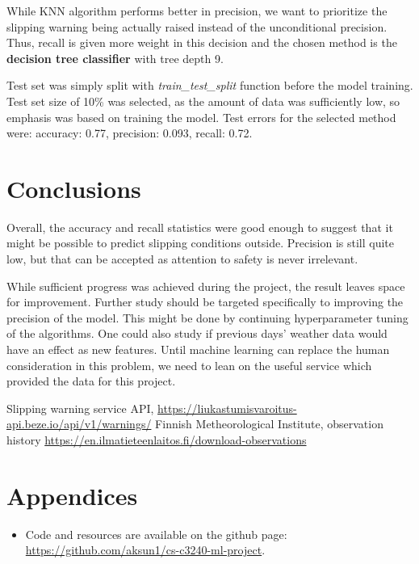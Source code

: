 \documentclass[12pt, a4paper]{article}
\begin{document}
    While KNN algorithm performs better in precision, we want to prioritize the slipping warning being 
    actually raised instead of the unconditional precision. Thus, recall is given more weight in this decision and
    the chosen method is the \textbf{decision tree classifier} with tree depth 9.

    Test set was simply split with \textit{train\_test\_split} function before the model training. 
    Test set size of 10\% was selected, as the amount of data was sufficiently low, so emphasis was based on training the model.
    Test errors for the selected method were: accuracy: 0.77, precision: 0.093, recall: 0.72.

    \section{Conclusions}
    Overall, the accuracy and recall statistics were good enough to suggest that it might be possible to predict 
    slipping conditions outside. Precision is still quite low, but that can be accepted as attention to safety is never irrelevant.

    While sufficient progress was achieved during the project, the result leaves space for improvement. Further
    study should be targeted specifically to improving the precision of the model. This might be done by continuing 
    hyperparameter tuning of the algorithms. One could also study if previous days' weather data would have an effect as new features.
    Until machine learning can replace the human consideration in this problem, we need to lean on the useful service
    which provided the data for this project.

    \newpage

    \begin{thebibliography}{9}
      Slipping warning service API, \href{https://liukastumisvaroitus-api.beze.io/api/v1/warnings/}{https://liukastumisvaroitus-api.beze.io/api/v1/warnings/}
      Finnish Metheorological Institute, observation history \href{https://en.ilmatieteenlaitos.fi/download-observations}{https://en.ilmatieteenlaitos.fi/download-observations}
    \end{thebibliography}

    \section{Appendices}
    \begin{itemize}
      \item Code and resources are available on the github page: \href{https://github.com/aksun1/cs-c3240-ml-project}{https://github.com/aksun1/cs-c3240-ml-project}.
    \end{itemize}
\end{document}
